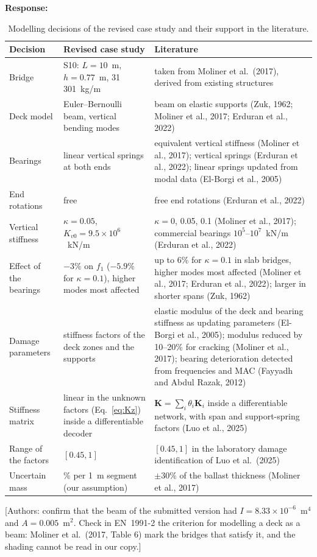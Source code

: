 \documentclass[11pt]{article}
\newenvironment{response}{\par\smallskip\noindent\color{resp}\textbf{Response:}\ }{\par}
\newcommand{\authornote}[1]{\textcolor{note}{\textsf{[Authors: #1]}}}
\begin{document}
\begin{response}
\begin{table}[H]
\centering\small
\caption{Modelling decisions of the revised case study and their support in the literature.}
\label{tab:lit}
\footnotesize
\begin{tabular}{>{\raggedright\arraybackslash}p{3.1cm}>{\raggedright\arraybackslash}p{4.3cm}%
>{\raggedright\arraybackslash}p{7.4cm}}
\toprule
Decision & Revised case study & Literature \\
\midrule
Bridge & S10: $L=10$~m, $h=0.77$~m, 31\,301~kg/m & taken from Moliner et al.\ (2017), derived from existing structures \\
Deck model & Euler--Bernoulli beam, vertical bending modes & beam on elastic supports (Zuk, 1962; Moliner et al., 2017; Erduran et al., 2022) \\
Bearings & linear vertical springs at both ends & equivalent vertical stiffness (Moliner et al., 2017); vertical springs (Erduran et al., 2022); linear springs updated
from modal data (El-Borgi et al., 2005) \\
End rotations & free & free end rotations (Erduran et al., 2022) \\
Vertical stiffness & $\kappa=0.05$, $K_{v0}=9.5\times10^{6}$~kN/m & $\kappa=0$, 0.05, 0.1 (Moliner et al., 2017); commercial bearings
$10^{5}$--$10^{7}$~kN/m (Erduran et al., 2022) \\
Effect of the bearings & $-3\%$ on $f_1$ ($-5.9\%$ for $\kappa=0.1$), higher modes most affected & up to 6\% for $\kappa=0.1$ in slab bridges, higher modes most affected (Moliner et
al., 2017; Erduran et al., 2022); larger in shorter spans (Zuk, 1962) \\
Damage parameters & stiffness factors of the deck zones and the supports & elastic modulus of the deck and bearing stiffness as updating parameters
(El-Borgi et al., 2005); modulus reduced by 10--20\% for cracking (Moliner et al., 2017); bearing deterioration detected from frequencies
and MAC (Fayyadh and Abdul Razak, 2012) \\
Stiffness matrix & linear in the unknown factors (Eq.~\eqref{eq:Kz}) inside a differentiable decoder & $\mathbf{K}=\sum_i\theta_i\mathbf{K}_i$ inside a differentiable network, with span and
support-spring factors (Luo et al., 2025) \\
Range of the factors & $[0.45,1]$ & $[0.45,1]$ in the laboratory damage identification of Luo et al.\ (2025) \\
Uncertain mass & 5\% per 1~m segment (our assumption) & $\pm30\%$ of the ballast thickness (Moliner et al., 2017) \\
\bottomrule
\end{tabular}
\end{table}
\authornote{confirm that the beam of the submitted version had $I=8.33\times10^{-6}$~m$^4$ and $A=0.005$~m$^2$. Check in EN~1991-2 the criterion for modelling a deck as a
beam: Moliner et al.\ (2017, Table 6) mark the bridges that satisfy it, and the shading cannot be read in our copy.}
\end{response}
\end{document}
